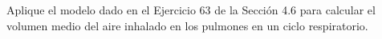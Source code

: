 \item Aplique el modelo dado en el Ejercicio 63 de la Sección 4.6 para calcular el volumen medio del aire inhalado en los pulmones en un ciclo respiratorio.
